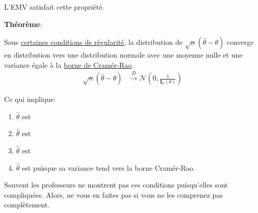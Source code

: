 \documentclass[10pt, french]{article}
\begin{document}
\begin{multicols*}{2}
\begin{definitionNOHFILL}
L'EMV satisfait cette propriété.
\end{definitionNOHFILL}

\begin{definitionNOHFILL}
\textbf{Théorème}:	

\tcbline

Sous \hyperlink{reg_cond}{\color{blue!40!green!80!black}certaines conditions de régularité}, la distribution de $\sqrt{n}\left( \hat{\theta}	-	\theta \right)$ converge en distribution vers une distribution normale avec une moyenne nulle et une variance égale à la \hyperref[sec:cramer_rao]{\color{azure(colorwheel)}borne de Cramér-Rao}.
\begin{align*}
	\sqrt{n}\left( \hat{\theta}	-	\theta \right)
	&\overset{D}{\rightarrow}
	\mathcal{N}\left( 0, \frac{1}{\bm{I}_{n}(\theta)} \right)
\end{align*}

Ce qui implique:
\begin{enumerate}
	\item	$\hat{\theta}$ est 
	\item	$\hat{\theta}$ est 
	\item	$\hat{\theta}$ est  
	\item	$\hat{\theta}$ est  puisque sa variance tend vers la borne Cramér-Rao.
\end{enumerate}
\end{definitionNOHFILL}
	
Souvent les professeurs ne montrent pas ces conditions puisqu'elles sont compliquées. Alors, ne vous en faites pas si vous ne les comprenez pas complètement.


\end{multicols*}
\end{document}
